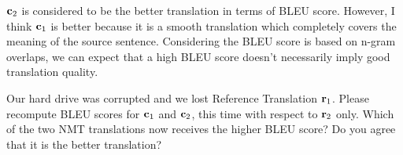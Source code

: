 \begin{parts}
\begin{subparts}
{            $\mathbf{c}_2$ is considered to be the better translation in terms of BLEU score. However, I think $\mathbf{c}_1$ is better because it is a smooth translation which completely covers the meaning of the source sentence. Considering the BLEU score is based on n-gram overlaps, we can expect that a high BLEU score doesn't necessarily imply good translation quality. 
        }
        
        \subpart[5] Our hard drive was corrupted and we lost Reference Translation $\mathbf{r}_1$. Please recompute BLEU scores for $\mathbf{c}_1$ and $\mathbf{c}_2$, this time with respect to $\mathbf{r}_2$ only. Which of the two NMT translations now receives the higher BLEU score? Do you agree that it is the better translation?

\end{subparts}
\end{parts}
